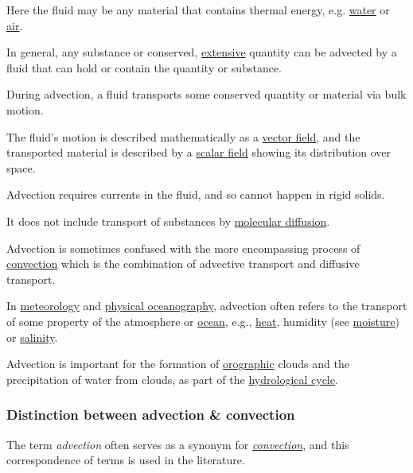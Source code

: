 \documentclass{article}
\begin{document}
Here the fluid may be any material that contains thermal energy, e.g. \href{https://en.wikipedia.org/wiki/Water}{water} or \href{https://en.wikipedia.org/wiki/Air}{air}.

In general, any substance or conserved, \href{https://en.wikipedia.org/wiki/Intensive_and_extensive_properties}{extensive} quantity can be advected by a fluid that can hold or contain the quantity or substance.

%
During advection, a fluid transports some conserved quantity or material via bulk motion.

The fluid's motion is described mathematically as a \href{https://en.wikipedia.org/wiki/Vector_field}{vector field}, and the transported material is described by a \href{https://en.wikipedia.org/wiki/Scalar_field}{scalar field} showing its distribution over space.

Advection requires currents in the fluid, and so cannot happen in rigid solids.

It does not include transport of substances by \href{https://en.wikipedia.org/wiki/Molecular_diffusion}{molecular diffusion}.

%
Advection is sometimes confused with the more encompassing process of \href{https://en.wikipedia.org/wiki/Convection}{convection} which is the combination of advective transport and diffusive transport.

%
In \href{https://en.wikipedia.org/wiki/Meteorology}{meteorology} and \href{https://en.wikipedia.org/wiki/Physical_oceanography}{physical oceanography}, advection often refers to the transport of some property of the atmosphere or \href{https://en.wikipedia.org/wiki/Ocean}{ocean}, e.g., \href{https://en.wikipedia.org/wiki/Heat}{heat}, humidity (see \href{https://en.wikipedia.org/wiki/Water_vapor}{moisture}) or \href{https://en.wikipedia.org/wiki/Salinity}{salinity}.

Advection is important for the formation of \href{https://en.wikipedia.org/wiki/Orographic}{orographic} clouds and the precipitation of water from clouds, as part of the \href{https://en.wikipedia.org/wiki/Hydrological_cycle}{hydrological cycle}.

\subsubsection{Distinction between advection \& convection}
The term \textit{advection} often serves as a synonym for \href{https://en.wikipedia.org/wiki/Convection}{\textit{convection}}, and this correspondence of terms is used in the literature.
\end{document}
